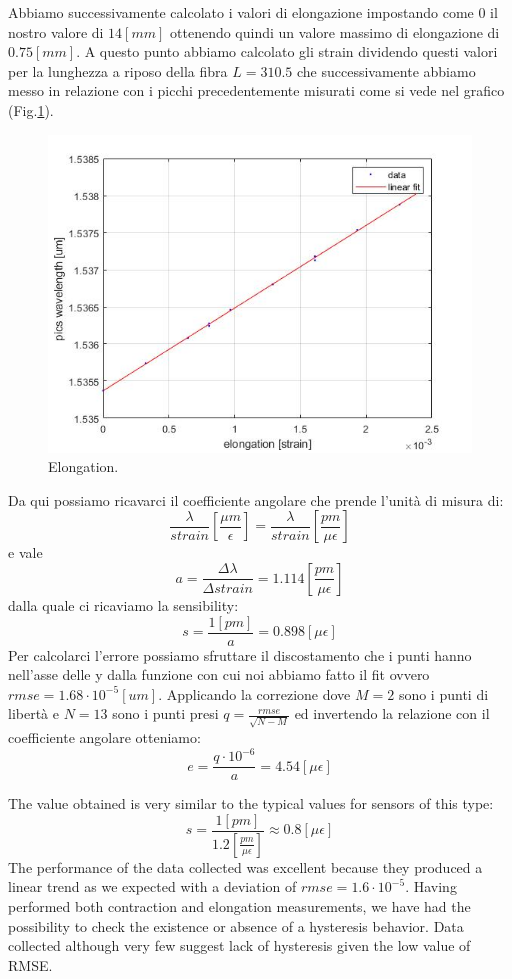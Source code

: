 Abbiamo successivamente calcolato i valori di elongazione impostando come 0 il nostro valore di $14[mm]$ ottenendo quindi un valore massimo di elongazione di $0.75[mm]$. A questo punto abbiamo calcolato gli strain dividendo questi valori per la lunghezza a riposo della fibra $L = 310.5$ che successivamente abbiamo messo in relazione con i picchi precedentemente misurati come si vede nel grafico (Fig.\ref{fig:spins}).
\begin{figure}[h]
    \centering
    \includegraphics[scale=0.7]{img/spins.jpg}
    \caption{Elongation.}
    \label{fig:spins}
\end{figure}
Da qui possiamo ricavarci il coefficiente angolare che prende l'unità di misura di:
$$\frac{\lambda}{strain}\left[\frac{\mu m}{\epsilon}\right] = \frac{\lambda}{strain}\left[\frac{pm}{\mu\epsilon}\right]$$
e vale
$$a = \frac{\Delta \lambda}{ \Delta strain} = 1.114 \left[\frac{pm}{\mu\epsilon}\right]$$
dalla quale ci ricaviamo la sensibility:
$$s = \frac{1[pm]}{a} = 0.898 [\mu\epsilon]$$
Per calcolarci l'errore possiamo sfruttare il discostamento che i punti hanno nell'asse delle y dalla funzione con cui noi abbiamo fatto il fit ovvero $rmse = 1.68\cdot10^{-5} [um]$. Applicando la correzione dove $M = 2$ sono i punti di libertà e $N = 13$ sono i punti presi $q = \frac{rmse}{\sqrt{N - M}}$ ed invertendo la relazione con il coefficiente angolare otteniamo:
$$e = \frac{q \cdot 10^{-6}}{a} = 4.54 [\mu\epsilon]$$

\newpage
{}
The value obtained is very similar to the typical values for sensors of this type:
$$s = \frac{1 [pm]}{ 1.2 \left[\frac{pm}{\mu\epsilon}\right]} \approx 0.8 [\mu \epsilon]$$
The performance of the data collected was excellent because they produced a linear trend as we expected with a deviation of $rmse = 1.6 \cdot 10^{-5}$. Having performed both contraction and elongation measurements, we have had the possibility to check the existence or absence of a hysteresis behavior. Data collected although very few suggest lack of hysteresis given the low value of RMSE.


